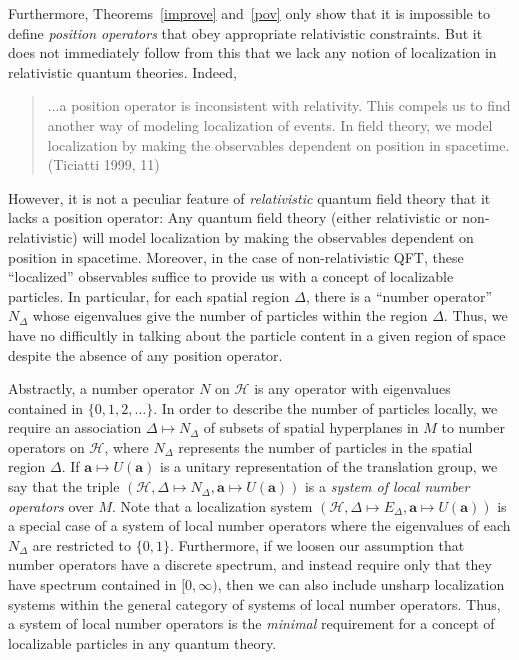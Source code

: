 \documentclass[11pt]{article}
\theoremstyle{remark}
\newcommand{\locsys}{(\mathcal{H},\Delta \mapsto
  E_{\Delta},\mathbf{a}\mapsto U(\mathbf{a}))}
\newcommand{\hil}[1]{\mathcal{#1}}
\begin{document}
Furthermore, Theorems~\ref{improve} and~\ref{pov} only show that it is
impossible to define \emph{position operators} that obey appropriate
relativistic constraints.  But it does not immediately follow from
this that we lack any notion of localization in relativistic quantum
theories.  Indeed,
\begin{quote} ...a position operator is
  inconsistent with relativity.  This compels us to find another way
  of modeling localization of events.  In field theory, we model
  localization by making the observables dependent on position in
  spacetime.  (Ticiatti 1999, 11) \end{quote} However, it is not a
peculiar feature of \emph{relativistic} quantum field theory that it
lacks a position operator: Any quantum field theory (either
relativistic or non-relativistic) will model localization by making
the observables dependent on position in spacetime.  Moreover, in the
case of non-relativistic QFT, these ``localized'' observables suffice
to provide us with a concept of localizable particles.  In particular,
for each spatial region $\Delta$, there is a ``number operator''
$N_{\Delta}$ whose eigenvalues give the number of particles within the
region $\Delta$.  Thus, we have no difficultly in talking about the
particle content in a given region of space despite the absence of any
position operator.

Abstractly, a number operator $N$ on $\hil{H}$ is any operator with
eigenvalues contained in $\{ 0,1,2,\dots \}$.  In order to describe
the number of particles locally, we require an association $\Delta
\mapsto N_{\Delta}$ of subsets of spatial hyperplanes in $M$ to number
operators on $\hil{H}$, where $N_{\Delta}$ represents the number of
particles in the spatial region $\Delta$.  If $\mathbf{a}\mapsto
U(\mathbf{a})$ is a unitary representation of the translation group,
we say that the triple $(\hil{H},\Delta \mapsto
N_{\Delta},\mathbf{a}\mapsto U(\mathbf{a}))$ is a \emph{system of
  local number operators} over $M$.  Note that a localization system
$\locsys$ is a special case of a system of local number operators
where the eigenvalues of each $N_{\Delta}$ are restricted to $\{ 0,1
\}$.  Furthermore, if we loosen our assumption that number operators
have a discrete spectrum, and instead require only that they have
spectrum contained in $[0,\infty )$, then we can also include unsharp
localization systems within the general category of systems of local
number operators.  Thus, a system of local number operators is the
\emph{minimal} requirement for a concept of localizable particles in
any quantum theory.
\end{document}
